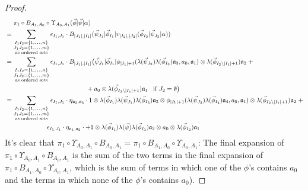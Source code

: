 \begin{proof}
\begin{align*}
& \phantom{{}={}}
\pi_1 \circ B_{A_1,A_0} \circ \Upsilon_{A_0,A_1} 
  (\vec{\phi} | \vec{\psi} | \alpha ) \\
&=
\sum \limits_{\substack{
  I_1I_2 = \{1,\smdots,n\}\\
  J_1J_2 = \{1,\smdots,m\}\\
  \textrm{as ordered sets}}}
\epsilon_{I_1,J_1} \cdot
B_{|J_1|, |I_1|} (\vec{\psi}_{J_1} | \vec{\phi}_{I_1} | 
  \upsilon_{|I_2|, |J_2|} (\vec{\phi}_{I_2} | \vec{\psi}_{J_2} | \alpha)) \\
&= 
\sum \limits_{\substack{
  I_1I_2 = \{1,\smdots,n\}\\
  J_1J_2 = \{1,\smdots,m\}\\
  \textrm{as ordered sets}}}
\epsilon_{I_1,J_1} \cdot
B_{|J_1|, |I_1|} \big(\vec{\psi}_{J_1} | \vec{\phi}_{I_1} | \phi_{|I_1|+1} (
  \lambda(\vec{\psi}_{J_2}) \lambda(\vec{\phi}_{I_3}) 
  \mathfrak{a}_3, a_0, \mathfrak{a}_1) \otimes 
  \lambda(\vec{\phi}_{I_2 \backslash |I_1| + 1}) 
  \mathfrak{a}_2 \; + \\
&\hphantom{{}moveovermoveovermoveover{}} 
  + a_0 \otimes \lambda(\vec{\phi}_{I_2 \backslash |I_1| + 1}) 
  \mathfrak{a}_1 \; \; \; 
  \text{if }J_2 = \emptyset \big) \\
&= 
\sum \limits_{\substack{
  I_1I_2 = \{1,\smdots,n\}\\
  J_1J_2 = \{1,\smdots,m\}\\
  \textrm{as ordered sets}}}
\epsilon_{I_1,J_1} \cdot  
\eta_{\mathfrak{a}_2,\mathfrak{a}_3} \cdot  
1 \otimes \lambda(\vec{\phi}_{I_1}) \lambda(\vec{\psi}_{J_1}) 
  \lambda(\vec{\phi}_{I_3}) \mathfrak{a}_3 \otimes 
  \phi_{|I_1|+1} (\lambda(\vec{\psi}_{J_2}) \lambda(\vec{\phi}_{I_4}) 
  \mathfrak{a}_4, a_0, \mathfrak{a}_1) \otimes 
  \lambda(\vec{\phi}_{I_2 \backslash |I_1| + 1}) 
  \mathfrak{a}_2 \; + \\
&\hphantom{{}moveovermove{}} 
  \epsilon_{I_1,J_1} \cdot  
  \eta_{\mathfrak{a}_1,\mathfrak{a}_2} \cdot  
  + 1 \otimes \lambda(\vec{\phi}_{I_1}) \lambda(\vec{\psi}) 
  \lambda(\vec{\phi}_{I_3}) \mathfrak{a}_2 \otimes 
  a_0 \otimes \lambda(\vec{\phi}_{I_2}) \mathfrak{a}_1
\end{align*}
%
It's clear that $\pi_1 \circ \Upsilon_{A_0,A_1} 
\circ B_{A_0,A_1} =  \pi_1 \circ B_{A_1,A_0} 
\circ \Upsilon_{A_0,A_1}$: The final expansion of 
$\pi_1 \circ \Upsilon_{A_0,A_1} \circ B_{A_0,A_1}$ 
is the sum of the two terms in the final expansion 
of $\pi_1 \circ B_{A_1,A_0} \circ \Upsilon_{A_0,A_1}$, 
which is the sum of terms in which one of 
the $\phi$'s contains $a_0$ and the terms in which 
none of the $\phi$'s contains $a_0$).
\end{proof}